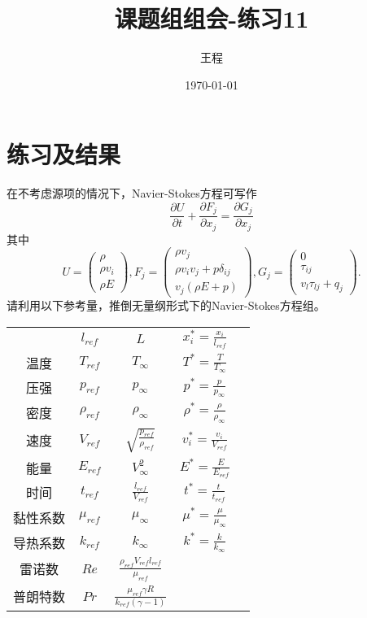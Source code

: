 \documentclass[a4paper,11pt,UTF8]{article}%
\theoremstyle{plain}
\begin{document}
	\title{\heiti 课题组组会-练习11}
	\author{王程 }
	\date{\today}
	\maketitle
	
	\section{练习及结果}
   在不考虑源项的情况下，Navier-Stokes方程可写作\\
   $$\frac{\partial U}{\partial t}+\frac{\partial F_j}{\partial x_j}=\frac{\partial G_j}{\partial x_j}$$
   其中\\
   
   $$U=\begin{pmatrix}
   		\rho\\
   		\rho v_i\\
   		\rho E
   	\end{pmatrix},
   	   F_j=\begin{pmatrix}
   		\rho v_j\\
   		\rho v_iv_j+p\delta_{ij}\\
   		v_j\left(\rho E+p\right)
   	\end{pmatrix},
   	G_j=\begin{pmatrix}
   		0\\
   		\tau_{ij}\\
   		v_{l}\tau_{lj}+q_j
   	\end{pmatrix}.
   	$$
   	请利用以下参考量，推倒无量纲形式下的Navier-Stokes方程组。
   		\begin{table}[H]
   		\centering
   		\label{tbl:table1}
   		\begin{tabular}{c|cccc}
   			\hline\hline
   		\makebox[0.2\textwidth][c]{长度}& $l_{ref}$&$ L$& $x^{*}_i=\frac{x_i}{l_{ref}}$\\[1.5ex]
   		温度& $T_{ref}$&$ T_{\infty}$& $T^{*}=\frac{T}{T_{\infty}}$\\[1.5ex]
   	    压强& $p_{ref}$&$ p_{\infty}$& $p^{*}=\frac{p}{p_{\infty}}$\\[1.5ex]
	    密度& $\rho_{ref}$&$\rho_{\infty}$& $\rho^{*}=\frac{\rho}{\rho_{\infty}}$\\[1.5ex]
		速度& $V_{ref}$&$ \sqrt{\frac{p_{ref}}{\rho_{ref}}}$& $v_i^{*}=\frac{v_i}{V_{ref}}$\\[1.5ex]
		能量& $E_{ref}$&$ V^2_{\infty}$& $E^{*}=\frac{E}{E_{ref}}$\\[1.5ex]
		时间& $t_{ref}$&$ \frac{l_{ref}}{V_{ref}}$& $t^{*}=\frac{t}{t_{ref}}$\\[1.5ex]
		黏性系数& $\mu_{ref}$&$ \mu_{\infty}$& $\mu^{*}=\frac{\mu}{\mu_{\infty}}$\\[1.5ex]
		导热系数& $k_{ref}$&$ k_{\infty}$& $k^{*}=\frac{k}{k_{\infty}}$\\[1.5ex]
	    雷诺数& $Re$&$ \frac{\rho_{ref}V_{ref}l_{ref}}{\mu_{ref}}$& \quad \\[1.5ex]
		普朗特数& $Pr$&$ \frac{\mu_{ref}\gamma R}{k_{ref}\left(\gamma-1\right)}$& \quad \\ [1.5ex]  
   			\hline \hline
   		\end{tabular} 
   	\end{table}
\end{document}
